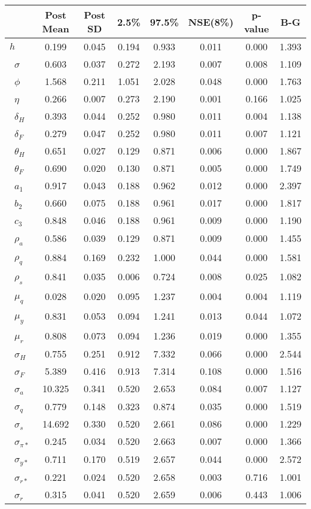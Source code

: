 \begin{tiny}\begin{tabular}{lccccccc}
\hline
&\textbf{Post Mean}&\textbf{Post SD}&\textbf{2.5\%}&\textbf{97.5\%}&\textbf{NSE(8\%)}&\textbf{p-value}&\textbf{B-G}\\\hline
\textbf{$ h             $}&0.199&0.045&0.194&0.933&0.011&0.000&1.393\\\
\textbf{$ \sigma        $}&0.603&0.037&0.272&2.193&0.007&0.008&1.109\\\
\textbf{$ \phi          $}&1.568&0.211&1.051&2.028&0.048&0.000&1.763\\\
\textbf{$ \eta          $}&0.266&0.007&0.273&2.190&0.001&0.166&1.025\\\
\textbf{$ \delta_{H}    $}&0.393&0.044&0.252&0.980&0.011&0.004&1.138\\\
\textbf{$ \delta_{F}    $}&0.279&0.047&0.252&0.980&0.011&0.007&1.121\\\
\textbf{$ \theta_{H}    $}&0.651&0.027&0.129&0.871&0.006&0.000&1.867\\\
\textbf{$ \theta_{F}    $}&0.690&0.020&0.130&0.871&0.005&0.000&1.749\\\
\textbf{$ a_{1}         $}&0.917&0.043&0.188&0.962&0.012&0.000&2.397\\\
\textbf{$ b_{2}         $}&0.660&0.075&0.188&0.961&0.017&0.000&1.817\\\
\textbf{$ c_{3}         $}&0.848&0.046&0.188&0.961&0.009&0.000&1.190\\\
\textbf{$ \rho_{a}      $}&0.586&0.039&0.129&0.871&0.009&0.000&1.455\\\
\textbf{$ \rho_{q}      $}&0.884&0.169&0.232&1.000&0.044&0.000&1.581\\\
\textbf{$ \rho_{s}      $}&0.841&0.035&0.006&0.724&0.008&0.025&1.082\\\
\textbf{$ \mu_{q}       $}&0.028&0.020&0.095&1.237&0.004&0.004&1.119\\\
\textbf{$ \mu_{y}       $}&0.831&0.053&0.094&1.241&0.013&0.044&1.072\\\
\textbf{$ \mu_{r}       $}&0.808&0.073&0.094&1.236&0.019&0.000&1.355\\\
\textbf{$ \sigma_{H}    $}&0.755&0.251&0.912&7.332&0.066&0.000&2.544\\\
\textbf{$ \sigma_{F}    $}&5.389&0.416&0.913&7.314&0.108&0.000&1.516\\\
\textbf{$ \sigma_{a}    $}&10.325&0.341&0.520&2.653&0.084&0.007&1.127\\\
\textbf{$ \sigma_{q}    $}&0.779&0.148&0.323&0.874&0.035&0.000&1.519\\\
\textbf{$ \sigma_{s}    $}&14.692&0.330&0.520&2.661&0.086&0.000&1.229\\\
\textbf{$ \sigma_{\pi*} $}&0.245&0.034&0.520&2.663&0.007&0.000&1.366\\\
\textbf{$ \sigma_{y*}   $}&0.711&0.170&0.519&2.657&0.044&0.000&2.572\\\
\textbf{$ \sigma_{r*}   $}&0.221&0.024&0.520&2.658&0.003&0.716&1.001\\\
\textbf{$ \sigma_{r}    $}&0.315&0.041&0.520&2.659&0.006&0.443&1.006\\\hline
\end{tabular}
\end{tiny}